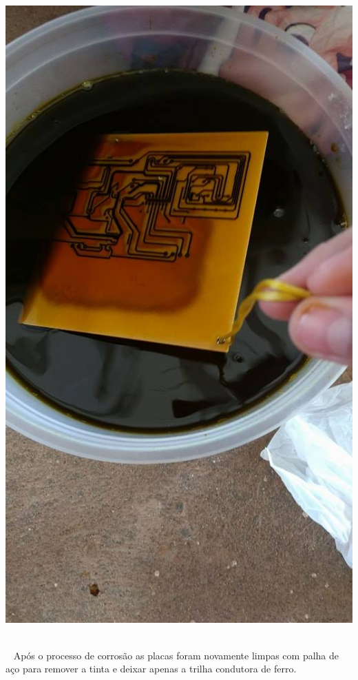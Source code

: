 \begin{center}
    \includegraphics[scale=0.3]{figuras/corroer}
       \label{corroer}
   \end{center}  
Após o processo de corrosão as placas foram novamente limpas com palha de aço para remover a tinta e deixar apenas a trilha condutora de ferro. 
